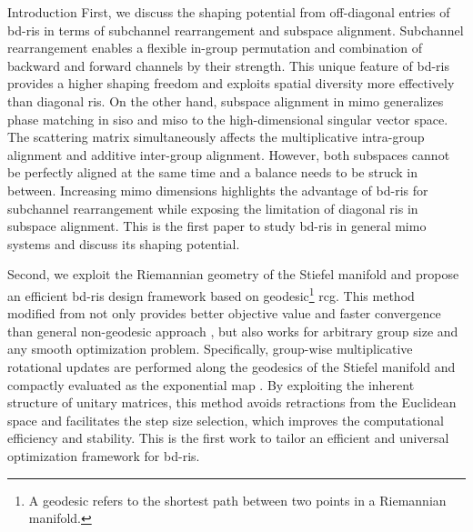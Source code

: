 \begin{section}{Introduction}
	First, we discuss the shaping potential from off-diagonal entries of \gls{bd}-\gls{ris} in terms of subchannel rearrangement and subspace alignment.
	Subchannel rearrangement enables a flexible in-group permutation and combination of backward and forward channels by their strength.
	This unique feature of \gls{bd}-\gls{ris} provides a higher shaping freedom and exploits spatial diversity more effectively than diagonal \gls{ris}.
	On the other hand, subspace alignment in \gls{mimo} generalizes phase matching in \gls{siso} and \gls{miso} to the high-dimensional singular vector space.
	The scattering matrix simultaneously affects the multiplicative intra-group alignment and additive inter-group alignment.
	However, both subspaces cannot be perfectly aligned at the same time and a balance needs to be struck in between.
	Increasing \gls{mimo} dimensions highlights the advantage of \gls{bd}-\gls{ris} for subchannel rearrangement while exposing the limitation of diagonal \gls{ris} in subspace alignment.
	This is the first paper to study \gls{bd}-\gls{ris} in general \gls{mimo} systems and discuss its shaping potential.

	Second, we exploit the Riemannian geometry of the Stiefel manifold and propose an efficient \gls{bd}-\gls{ris} design framework based on geodesic\footnote{A geodesic refers to the shortest path between two points in a Riemannian manifold.} \gls{rcg}.
	This method modified from \cite{Abrudan2008,Abrudan2009} not only provides better objective value and faster convergence than general non-geodesic approach \cite{Absil2009,Pan2022d}, but also works for arbitrary group size and any smooth optimization problem.
	Specifically, group-wise multiplicative rotational updates are performed along the geodesics of the Stiefel manifold and compactly evaluated as the exponential map \cite{Edelman1998}.
	By exploiting the inherent structure of unitary matrices, this method avoids retractions from the Euclidean space and facilitates the step size selection, which improves the computational efficiency and stability.
	This is the first work to tailor an efficient and universal optimization framework for \gls{bd}-\gls{ris}.


\end{section}
